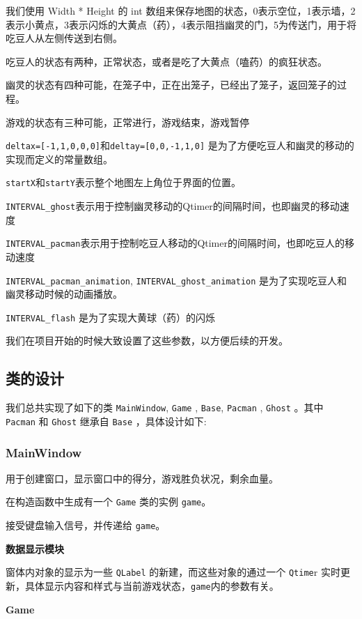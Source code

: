 \documentclass[UTF8,11pt]{ctexart}
\begin{document}
        我们使用 Width * Height 的 int 数组来保存地图的状态，0表示空位，1表示墙，2表示小黄点，3表示闪烁的大黄点（药），4表示阻挡幽灵的门，5为传送门，用于将吃豆人从左侧传送到右侧。
	
        吃豆人的状态有两种，正常状态，或者是吃了大黄点（嗑药）的疯狂状态。
	    
        幽灵的状态有四种可能，在笼子中，正在出笼子，已经出了笼子，返回笼子的过程。
	
        游戏的状态有三种可能，正常进行，游戏结束，游戏暂停
	
        \verb|deltax=[-1,1,0,0,0]|和\verb|deltay=[0,0,-1,1,0]| 是为了方便吃豆人和幽灵的移动的实现而定义的常量数组。
	
        \verb|startX|和\verb|startY|表示整个地图左上角位于界面的位置。
	
        \verb|INTERVAL_ghost|表示用于控制幽灵移动的Qtimer的间隔时间，也即幽灵的移动速度
	
        \verb|INTERVAL_pacman|表示用于控制吃豆人移动的Qtimer的间隔时间，也即吃豆人的移动速度
	
        \verb|INTERVAL_pacman_animation|, \verb|INTERVAL_ghost_animation| 是为了实现吃豆人和幽灵移动时候的动画播放。
	
        \verb|INTERVAL_flash| 是为了实现大黄球（药）的闪烁
	
        我们在项目开始的时候大致设置了这些参数，以方便后续的开发。
    \subsection{类的设计}
        我们总共实现了如下的类 \verb|MainWindow|, \verb|Game|  , \verb|Base|, \verb|Pacman| , \verb|Ghost| 。其中 \verb|Pacman| 和 \verb|Ghost| 继承自 \verb|Base| ，具体设计如下:
    \subsubsection{MainWindow}
        用于创建窗口，显示窗口中的得分，游戏胜负状况，剩余血量。
	
        在构造函数中生成有一个 \verb|Game| 类的实例 \verb|game|。
	
        接受键盘输入信号，并传递给 \verb|game|。
    
        \textbf{数据显示模块}
	
        窗体内对象的显示为一些 \verb|QLabel| 的新建，而这些对象的通过一个 \verb|Qtime|r 实时更新，具体显示内容和样式与当前游戏状态，\verb|game|内的参数有关。

        \textbf{Game}
	
\end{document}
